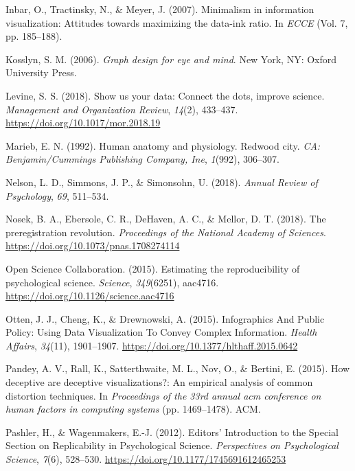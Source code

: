\documentclass[
  english,
  man]{apa6}
\newlength{\cslhangindent}
\newenvironment{cslreferences}%
  {\setlength{\parindent}{0pt}%
  \everypar{\setlength{\hangindent}{\cslhangindent}}\ignorespaces}%
  {\par}
\begin{document}
\begin{cslreferences}
\leavevmode\hypertarget{ref-inbar2007minimalism}{}%
Inbar, O., Tractinsky, N., \& Meyer, J. (2007). Minimalism in information visualization: Attitudes towards maximizing the data-ink ratio. In \emph{ECCE} (Vol. 7, pp. 185--188).

\leavevmode\hypertarget{ref-Kosslyn2006e}{}%
Kosslyn, S. M. (2006). \emph{Graph design for eye and mind}. New York, NY: Oxford University Press.

\leavevmode\hypertarget{ref-Levine2018}{}%
Levine, S. S. (2018). Show us your data: Connect the dots, improve science. \emph{Management and Organization Review}, \emph{14}(2), 433--437. \url{https://doi.org/10.1017/mor.2018.19}

\leavevmode\hypertarget{ref-marieb1992human}{}%
Marieb, E. N. (1992). Human anatomy and physiology. Redwood city. \emph{CA: Benjamin/Cummings Publishing Company, Ine}, \emph{1}(992), 306--307.

\leavevmode\hypertarget{ref-Nelson2018a}{}%
Nelson, L. D., Simmons, J. P., \& Simonsohn, U. (2018). \emph{Annual Review of Psychology}, \emph{69}, 511--534.

\leavevmode\hypertarget{ref-Nosek2018}{}%
Nosek, B. A., Ebersole, C. R., DeHaven, A. C., \& Mellor, D. T. (2018). The preregistration revolution. \emph{Proceedings of the National Academy of Sciences}. \url{https://doi.org/10.1073/pnas.1708274114}

\leavevmode\hypertarget{ref-open_science_collaboration_estimating_2015}{}%
Open Science Collaboration. (2015). Estimating the reproducibility of psychological science. \emph{Science}, \emph{349}(6251), aac4716. \url{https://doi.org/10.1126/science.aac4716}

\leavevmode\hypertarget{ref-Otten2015}{}%
Otten, J. J., Cheng, K., \& Drewnowski, A. (2015). Infographics And Public Policy: Using Data Visualization To Convey Complex Information. \emph{Health Affairs}, \emph{34}(11), 1901--1907. \url{https://doi.org/10.1377/hlthaff.2015.0642}

\leavevmode\hypertarget{ref-pandey2015deceptive}{}%
Pandey, A. V., Rall, K., Satterthwaite, M. L., Nov, O., \& Bertini, E. (2015). How deceptive are deceptive visualizations?: An empirical analysis of common distortion techniques. In \emph{Proceedings of the 33rd annual acm conference on human factors in computing systems} (pp. 1469--1478). ACM.

\leavevmode\hypertarget{ref-Pashler2012a}{}%
Pashler, H., \& Wagenmakers, E.-J. (2012). Editors' Introduction to the Special Section on Replicability in Psychological Science. \emph{Perspectives on Psychological Science}, \emph{7}(6), 528--530. \url{https://doi.org/10.1177/1745691612465253}


\end{cslreferences}
\end{document}

